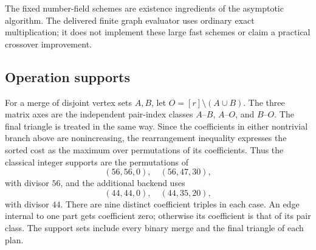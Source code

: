 The fixed number-field schemes are existence ingredients of the
asymptotic algorithm. The delivered finite graph evaluator uses ordinary
exact multiplication; it does not implement these large fast schemes or
claim a practical crossover improvement.

\subsection{Operation supports}

For a merge of disjoint vertex sets $A,B$, let
$O=[r]\setminus(A\cup B)$. The three matrix axes are the independent
pair-index classes $A$--$B$, $A$--$O$, and $B$--$O$. The final triangle
is treated in the same way. Since the coefficients in either nontrivial
branch above are nonincreasing, the rearrangement inequality expresses
the sorted cost as the maximum over permutations of its coefficients.
Thus the classical integer supports are the permutations of
\[
 (56,56,0),\quad(56,47,30),
\]
with divisor $56$, and the additional backend uses
\[
 (44,44,0),\quad(44,35,20),
\]
with divisor $44$. There are nine distinct coefficient triples in each
case. An edge internal to one part gets coefficient zero; otherwise its
coefficient is that of its pair class. The support sets include every
binary merge and the final triangle of each plan.
